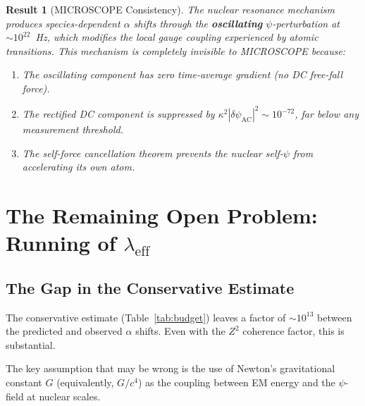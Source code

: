 \documentclass[aps,prd,twocolumn,superscriptaddress,nofootinbib]{revtex4-2}
\newcommand{\kap}{\kappa}
\newcommand{\lam}{\lambda}
\newtheorem{result}{Result}
\begin{document}
\begin{result}[MICROSCOPE Consistency]
The nuclear resonance mechanism produces species-dependent $\alpha$
shifts through the \textbf{oscillating} $\psi$-perturbation at
$\sim\!10^{22}$~Hz, which modifies the local gauge coupling
experienced by atomic transitions.  This mechanism is completely
invisible to MICROSCOPE because:

\begin{enumerate}[nosep]
\item The oscillating component has zero time-average gradient
(no DC free-fall force).

\item The rectified DC component is suppressed by $\kap^2
|\delta\psi_{\mathrm{AC}}|^2 \sim 10^{-72}$, far below any
measurement threshold.

\item The self-force cancellation theorem prevents the nuclear
self-$\psi$ from accelerating its own atom.
\end{enumerate}
\end{result}


\section{The Remaining Open Problem: Running of $\lam_{\mathrm{eff}}$}
\label{sec:running}

\subsection{The Gap in the Conservative Estimate}
\label{sec:gap}

The conservative estimate (Table~\ref{tab:budget}) leaves a factor
of $\sim\!10^{13}$ between the predicted and observed $\alpha$ shifts.
Even with the $Z^2$ coherence factor, this is substantial.

The key assumption that may be wrong is the use of Newton's
gravitational constant $G$ (equivalently, $G/c^4$) as the coupling
between EM energy and the $\psi$-field at nuclear scales.
\end{document}
